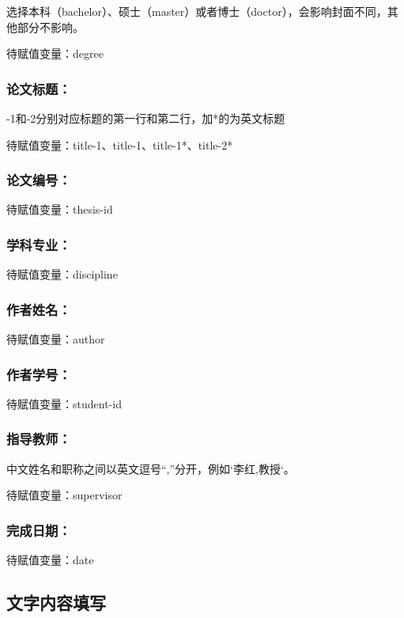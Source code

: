 选择本科（bachelor）、硕士（master）或者博士（doctor），会影响封面不同，其他部分不影响。

待赋值变量：degree

\subsubsection{论文标题：}

-1和-2分别对应标题的第一行和第二行，加*的为英文标题

待赋值变量：title-1、title-1、title-1*、title-2*

\subsubsection{论文编号：}

待赋值变量：thesis-id

\subsubsection{学科专业：}

待赋值变量：discipline

\subsubsection{作者姓名：}

待赋值变量：author

\subsubsection{作者学号：}

待赋值变量：student-id

\subsubsection{指导教师：}

中文姓名和职称之间以英文逗号“,”分开，例如`{李红,教授}`。

待赋值变量：supervisor

\subsubsection{完成日期：}

待赋值变量：date

\subsection{文字内容填写}

